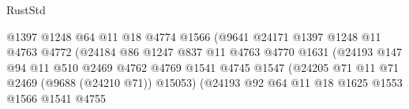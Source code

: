 \begin{lexlean}{RustStd}
\begin{coremodule}
                                          @1397
                                          @1248
                                          @64
                                          @11
                                          @18
                                          @4774
                                          @1566
                                          (@9641
                                            @24171
                                            @1397
                                            @1248
                                            @11
                                            @4763
                                            @4772
                                            (@24184
                                              @86
                                              @1247
                                              @837
                                              @11
                                              @4763
                                              @4770
                                              @1631
                                              (@24193
                                                @147
                                                @94
                                                @11
                                                @510
                                                @2469
                                                @4762
                                                @4769
                                                @1541
                                                @4745
                                                @1547
                                                (@24205
                                                  @71
                                                  @11
                                                  @71
                                                  @2469
                                                  (@9688 (@24210 @71))
                                                  @15053)
                                                (@24193
                                                  @92
                                                  @64
                                                  @11
                                                  @18
                                                  @1625
                                                  @1553
                                                  @1566
                                                  @1541
                                                  @4755

\end{coremodule}
\end{lexlean}
